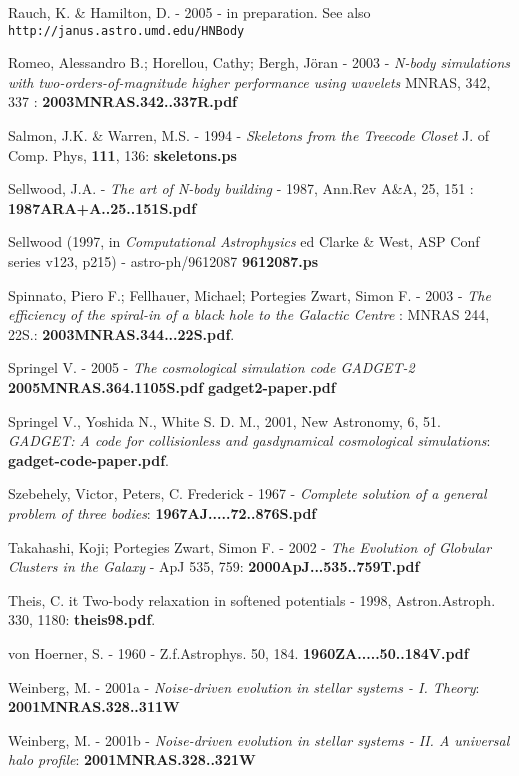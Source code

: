 Rauch, K. \& Hamilton, D. - 2005 - in preparation. See also
{\tt http://janus.astro.umd.edu/HNBody}


Romeo, Alessandro B.; Horellou, Cathy; Bergh, Jöran - 2003 - 
{\it N-body simulations with two-orders-of-magnitude higher performance using wavelets}
MNRAS, 342, 337 : {\bf 2003MNRAS.342..337R.pdf}

Salmon, J.K. \& Warren, M.S. - 1994 -
{\it Skeletons from the Treecode Closet} J. of Comp. Phys, {\bf 111}, 136:
{\bf skeletons.ps}

Sellwood, J.A. - {\it The art of N-body building} - 1987, Ann.Rev A\&A, 25, 151 : 
{\bf 1987ARA+A..25..151S.pdf}



Sellwood (1997, in {\it Computational Astrophysics} 
ed Clarke \& West,  ASP  Conf  series  v123, p215) - astro-ph/9612087
{\bf 9612087.ps}

Spinnato, Piero F.; Fellhauer, Michael; Portegies Zwart, Simon F. - 2003 -
{\it The efficiency of the spiral-in of a black hole to the Galactic Centre} :
MNRAS 244, 22S.: {\bf 2003MNRAS.344...22S.pdf}.

Springel V. - 2005 -
{\it The cosmological simulation code GADGET-2}
{\bf 2005MNRAS.364.1105S.pdf} {\bf gadget2-paper.pdf}

Springel V., Yoshida N., White S. D. M., 2001, New Astronomy, 6, 51. 
{\it GADGET: A code for collisionless and gasdynamical cosmological simulations}:
{\bf gadget-code-paper.pdf}.

Szebehely, Victor, Peters, C. Frederick - 1967 - 
{\it Complete solution of a general problem of three bodies}:
{\bf 1967AJ.....72..876S.pdf}

Takahashi, Koji; Portegies Zwart, Simon F. - 2002 -
{\it The Evolution of Globular Clusters in the Galaxy} - ApJ 535, 759:
{\bf 2000ApJ...535..759T.pdf}

Theis, C. {it  Two-body relaxation in softened potentials} - 1998, Astron.Astroph. 330, 1180:
{\bf theis98.pdf}.

von Hoerner, S. - 1960 - Z.f.Astrophys. 50, 184.
{\bf 1960ZA.....50..184V.pdf}


Weinberg, M. - 2001a - 
{\it Noise-driven evolution in stellar systems - I. Theory}:
{\bf 2001MNRAS.328..311W}

Weinberg, M. - 2001b - 
{\it Noise-driven evolution in stellar systems - II. A universal halo profile}:
{\bf 2001MNRAS.328..321W}



